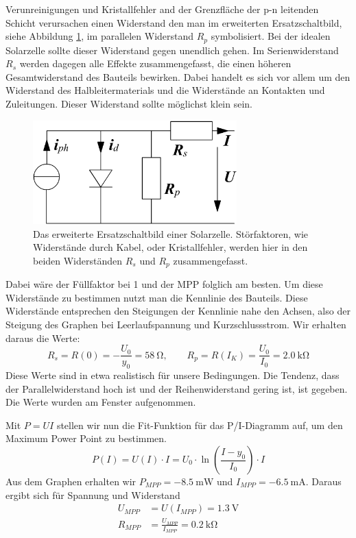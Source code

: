 Verunreinigungen und Kristallfehler and der Grenzfläche der p-n leitenden
Schicht verursachen einen Widerstand den man im erweiterten Ersatzschaltbild,
siehe Abbildung \ref{solarschalt}, im parallelen Widerstand $R_p$ symbolisiert.
Bei der idealen Solarzelle sollte dieser Widerstand gegen unendlich gehen.
Im Serienwiderstand $R_s$ werden dagegen alle Effekte zusammengefasst, die einen
höheren Gesamtwiderstand des Bauteils bewirken. Dabei handelt es sich vor allem
um den Widerstand des Halbleitermaterials und die Widerstände an Kontakten und
Zuleitungen. Dieser Widerstand sollte möglichst klein sein.
\begin{figure}[h]
	\centering
	\includegraphics[width=0.7\textwidth]{Abb/solarschalt.png}
	\caption{Das erweiterte Ersatzschaltbild einer Solarzelle. Störfaktoren, wie
			 Widerstände durch Kabel, oder Kristallfehler, werden hier in den
			 beiden Widerständen $R_s$ und $R_p$ zusammengefasst.}
	\label{solarschalt}
\end{figure}
Dabei wäre der Füllfaktor bei 1 und der MPP folglich am besten.
Um diese Widerstände zu bestimmen nutzt man die Kennlinie des Bauteils.
Diese Widerstände entsprechen den Steigungen der Kennlinie nahe den Achsen, also der Steigung des Graphen bei Leerlaufspannung und Kurzschlussstrom.
Wir erhalten daraus die Werte:
\[
R_s=R(0)=-\frac{U_0}{y_0}=\SI{58}{\ohm}, \qquad
R_p=R(I_K)=\frac{U_0}{I_0}=\SI{2,0}{\kilo \ohm}
\]
Diese Werte sind in etwa realistisch für unsere Bedingungen. Die Tendenz, dass der Parallelwiderstand hoch ist und der Reihenwiderstand gering ist, ist gegeben. Die Werte wurden am Fenster aufgenommen.

Mit $P=UI$ stellen wir nun die Fit-Funktion für das P/I-Diagramm auf, um den Maximum Power Point zu bestimmen.
\[
	P(I)=U(I) \cdot I=U_0 \cdot \ln \left( \frac{I-y_0}{I_0} \right) \cdot I
\]
Aus dem Graphen erhalten wir $P_{MPP}= \SI{-8,5}{\milli \watt}$ und $I_{MPP} = \SI{-6,5}{\milli \ampere}$.
Daraus ergibt sich für Spannung und Widerstand
\begin{align*}
	U_{MPP} &= U(I_{MPP}) = \SI{1,3}{\volt} \\
	R_{MPP} &= \frac{U_{MPP}}{I_{MPP}} = \SI{0,2}{\kilo \ohm}
\end{align*}

